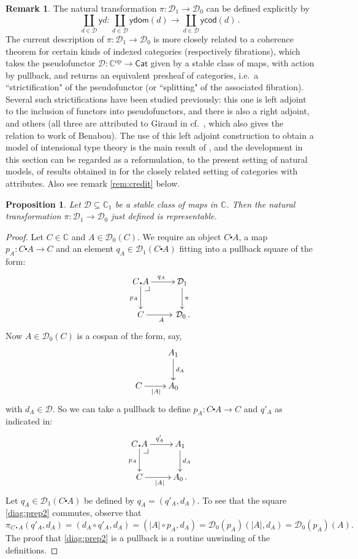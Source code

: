 \documentclass[12pt]{article}
\makeatletter
\newcommand{\C}{\ensuremath{\mathbb{C}}}
\newcommand{\D}{\ensuremath{\mathcal{D}}}
\newcommand{\Cat}{\ensuremath{\mathsf{Cat}}}
\newcommand{\op}{\ensuremath{^\mathrm{op}}}
\newcommand{\pbcorner}[1][dr]{\save*!/#1-1.2pc/#1:(-1,1)@^{|-}\restore}
\newcommand{\dom}{\ensuremath{\mathsf{dom}}}
\newcommand{\cod}{\ensuremath{\mathsf{cod}}}
\newcommand{\y}{\ensuremath{\mathsf{y}}}
\newcommand{\ext}[2]{{#1\!\centerdot\! #2}}
\newcommand{\btexdot}[2]{\ensuremath{{#1}\!\centerdot\!{#2}}}
\newtheorem{proposition}[theorem]{Proposition}
\theoremstyle{definition}
\newtheorem{remark}[theorem]{Remark}
\makeatother
\begin{document}
\begin{remark}\label{remark:Dalternate}
The natural transformation $\pi : \D_1\to\D_0$ can be defined explicitly by
\[
\coprod_{d\in\D}\y{d} : \coprod_{d\in\D}\y\dom(d) \to \coprod_{d\in\D}\y\cod(d)\,.
\]
The current description of $\pi: \D_1\to \D_0$ is more closely related to a coherence theorem for certain kinds of indexed categories (respectively fibrations), which takes the pseudofunctor $\D : \C\op\to\Cat$ given by a stable class of maps, with action by pullback, and returns an equivalent presheaf of categories, i.e.\ a ``strictification" of the pseudofunctor (or ``splitting" of the associated fibration). Several such strictifications have been studied previously: this one is left adjoint to the inclusion of functors into pseudofunctors, and there is also a right adjoint, and others (all three are attributed to Giraud in cf.~\cite{Streicher}, which also gives the relation to work of Benabou). The use of this left adjoint construction to obtain a model of intensional type theory is the main result of \cite{LW}, and the development in this section can be regarded as a reformulation, to the present setting of natural models, of results obtained in \cite{LW} for the closely related setting of categories with attributes. Also see remark \ref{rem:credit} below.
\end{remark}

\begin{proposition}\label{prop:Dtorepnattrans}
Let $\D\subseteq\C_1$ be a stable class of maps in $\C$.  Then the natural transformation  $\pi : \D_1\to \D_0$ just defined is representable.
\end{proposition}

\begin{proof}
Let $C\in\C$ and $A\in\D_0(C)$.  We require an object $\btexdot{C}{A}$, a map $p_{A}:\btexdot{C}{A} \to C$ and an element $q_A\in \D_1(\btexdot{C}{A})$ fitting into a pullback square of the form:
\begin{equation}\label{diag:prep2}
\xymatrix{
\ext{C}{A} \ar[d]_{p_A} \ar[r]^{q_A} \pbcorner &  \D_1\ar[d]^{\pi}\\
C \ar[r]_{A}   & \,\D_0\,.}
\end{equation}
Now $A\in\D_0(C)$ is a cospan of the form, say,
\[
\xymatrix{& A_1 \ar[d]^{d_A} \\
				C \ar[r]_{|A|} & A_0}
				\]
with $d_A \in \D$.  So we can take a pullback to define $p_{A}:\btexdot{C}{A} \to C$ and $q'_A $  as indicated in:
\begin{equation}\label{diag:prep3}
\xymatrix{
\ext{C}{A} \ar[d]_{p_A} \ar[r]^{q'_A} \pbcorner &  A_1\ar[d]^{d_A}\\
C \ar[r]_{|A|}   & A_0\,.}
\end{equation}
Let $q_A \in \D_1(\btexdot{C}{A})$ be defined by  $q_A = (q'_A, d_A)$. To see that the square \eqref{diag:prep2} commutes, observe that 
\[
\pi_{\btexdot{C\,}{\,A}}(q'_A, d_A) = (d_A\circ q'_A, d_A) = (|A|\circ p_A, d_A) = \D_0(p_{A})(|A|, d_A) = \D_0(p_{A})(A).
\]
The proof that \eqref{diag:prep2} is a pullback is a routine unwinding of the definitions.
\end{proof}
\end{document}
